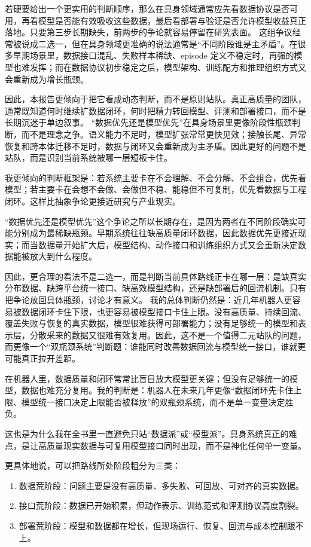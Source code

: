 若硬要给出一个更实用的判断顺序，那么在具身领域通常应先看数据协议是否可用，再看模型是否能有效吸收这些数据，最后看部署与验证是否允许模型收益真正落地。只要第三步长期缺失，前两步的争论就容易停留在研究表面。 这组争议经常被说成二选一，但在具身领域更准确的说法通常是“不同阶段谁是主矛盾”。在很多早期场景里，数据接口混乱、失败样本稀缺、episode 定义不稳定时，再强的模型也难发挥；而在数据协议初步稳定之后，模型架构、训练配方和推理组织方式又会重新成为增长瓶颈。

因此，本报告更倾向于把它看成动态判断，而不是原则站队。真正高质量的团队，通常既知道何时继续扩数据闭环，何时把精力转回模型、评测和部署接口，而不是长期沉迷于单边叙事。 “数据优先还是模型优先”在具身场景里更像阶段性瓶颈判断，而不是理念之争。语义能力不足时，模型扩张常常更快见效；接触长尾、异常恢复和跨本体迁移不足时，数据与闭环又会重新成为主矛盾。因此更好的问题不是站队，而是识别当前系统被哪一层短板卡住。

我更倾向的判断框架是：若系统主要卡在不会理解、不会分解、不会组合，优先看模型；若主要卡在会想不会做、会做但不稳、能稳但不可复制，优先看数据与工程闭环。这样比抽象争论更接近研究与产业现实。

“数据优先还是模型优先”这个争论之所以长期存在，是因为两者在不同阶段确实可能分别成为最稀缺瓶颈。早期系统往往缺高质量闭环数据，因此数据优先更接近现实；而当数据量开始扩大后，模型结构、动作接口和训练组织方式又会重新决定数据能被放大到什么程度。

因此，更合理的看法不是二选一，而是判断当前具体路线正卡在哪一层：是缺真实分布数据、缺跨平台统一接口、缺高效模型结构，还是缺部署后的回流机制。只有把争论放回具体瓶颈，讨论才有意义。 我的总体判断仍然是：近几年机器人更容易被数据闭环卡住下限，也更容易被模型接口卡住上限。没有高质量、持续回流、覆盖失败与恢复的真实数据，模型很难获得可部署能力；没有足够统一的模型和表示层，分散采来的数据又很难有效复用。因此，这不是一个值得二元站队的问题，而更像一个“双瓶颈系统”判断题：谁能同时改善数据回流与模型统一接口，谁就更可能真正拉开差距。

在机器人里，数据质量和闭环常常比盲目放大模型更关键；但没有足够统一的模型，数据也难充分复用。我的判断是：机器人在未来几年更像“数据闭环先卡住上限、模型统一接口决定上限能否被释放”的双瓶颈系统，而不是单一变量决定胜负。

这也是为什么我在全书里一直避免只站“数据派”或“模型派”。具身系统真正的难点，是让高质量现实数据与可复用模型接口同时出现，而不是神化任何单一变量。

更具体地说，可以把路线所处阶段粗分为三类：

\begin{enumerate}
\item 数据荒阶段：问题主要是没有高质量、多失败、可回放、可对齐的真实数据。
\item 接口荒阶段：数据已开始积累，但动作表示、训练范式和评测协议高度割裂。
\item 部署荒阶段：模型和数据都在增长，但现场运行、恢复、回流与成本控制跟不上。
\end{enumerate}

